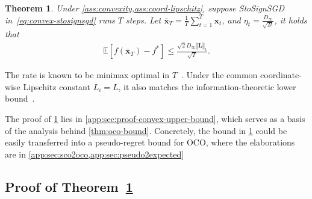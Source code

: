 \documentclass{article}
\newtheorem{thm}{Theorem}
\def \E {\mathbb{E}}
\def \x {\mathbf{x}}
\def \Lb {\mathbf{L}}
\def \xb {\overline{\x}}
\newcommand{\norm}[1]{\left\Vert#1\right\Vert}
\newcommand{\sqbrac}[1]{\left[#1\right]}
\begin{document}
\begin{thm}\label{thm:convex-upper-bound}
    Under \cref{ass:convexity,ass:coord-lipschitz}, suppose StoSignSGD in~\eqref{eq:convex-stosignsgd} runs $T$ steps. Let $\xb_T=\frac{1}{T}\sum_{t=1}^T\x_t$, and $\eta_t=\frac{D_\infty}{\sqrt{2t}}$, it holds that 
    \begin{align*}
        \E\sqbrac{f(\xb_T)-f^*}\le\frac{\sqrt{2}D_\infty\norm{\Lb}_1}{\sqrt{T}}.
    \end{align*}
\end{thm}

The rate is known to be minimax optimal in $T$~\citep{nemirovskij1983problem}. Under the common coordinate-wise Lipschitz constant $L_i=L$, it also matches the information-theoretic lower bound~\citep{agarwal2012information}.  

The proof of \cref{thm:convex-upper-bound} lies in \cref{app:sec:proof-convex-upper-bound}, which serves as a basis of the analysis behind \cref{thm:oco-bound}. Concretely, the bound in \cref{thm:convex-upper-bound} could be easily transferred into a pseudo-regret bound for OCO, where the elaborations are in \cref{app:sec:sco2oco,app:sec:pseudo2expected}

\subsection{Proof of Theorem~\ref{thm:convex-upper-bound}\label{app:sec:proof-convex-upper-bound}}
\end{document}
